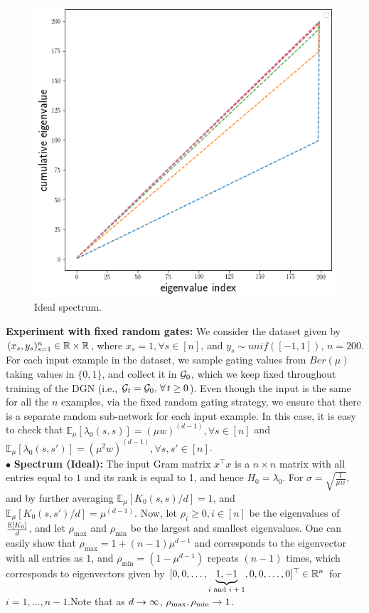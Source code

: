 \begin{figure}
\includegraphics[scale=0.15]{figs/dgn-fra-ecdf-ideal.png}
\caption{Ideal spectrum.}
\label{fig:ideal-spectrum}
\end{figure}
\textbf{Experiment with fixed random gates:} We consider the dataset given by $(x_s,y_s)_{s=1}^n\in \mathbb{R}\times \mathbb{R}$, where $x_s=1,\forall s\in [n]$, and $y_s\sim unif([-1,1])$, $n=200$. For each input example in the dataset, we sample gating values from $Ber(\mu)$ taking values in $\{0,1\}$, and collect it in $\mathcal{G}_0$, which we keep fixed throughout training of the DGN (i.e., $\mathcal{G}_t=\mathcal{G}_0,\,\forall\,t\geq 0$).  Even though the input is the same for all the $n$ examples, via the fixed random gating strategy, we ensure that there is a separate random sub-network for each input example.  In this case, it is easy to check that $\mathbb{E}_{\mu}\left[\lambda_0(s,s)\right]=(\mu w)^{(d-1)},\forall s\in[n]$ and $\mathbb{E}_{\mu}\left[\lambda_0(s,s')\right]=(\mu^2 w)^{(d-1)},\forall s,s'\in[n]$.\\
$\bullet$ \textbf{Spectrum (Ideal):} The input Gram matrix $x^\top x$ is a $n\times n$ matrix with all entries equal to $1$ and its rank is equal to 1, and hence $H_0=\lambda_0$.  For $\sigma=\sqrt{\frac{1}{\mu w}}$, and by further averaging $\mathbb{E}_{\mu}\left[K_0(s,s)/d\right]=1$, and $\mathbb{E}_{\mu}\left[K_0(s,s')/d\right]=\mu^{(d-1)}$. Now, let $\rho_i\geq 0,i \in [n]$ be the eigenvalues of $\frac{\mathbb{E}\left[K_0\right]}{d}$, and let $\rho_{\max}$ and $\rho_{\min}$ be the largest and smallest eigenvalues.  One can easily show that $\rho_{\max}=1+(n-1)\mu^{d-1}$ and corresponds to the eigenvector with all entries as $1$, and $\rho_{\min}=(1-\mu^{d-1})$ repeats $(n-1)$ times,  which corresponds to eigenvectors given by $[0, 0, \ldots, \underbrace{1, -1}_{\text{$i$ and $i+1$}}, 0,0,\ldots, 0]^\top \in \mathbb{R}^n$ for $i=1,\ldots,n-1$.\WFclear Note that as $d\rightarrow\infty$, $\rho_{\max},\rho_{\min}\rightarrow 1$.\\
